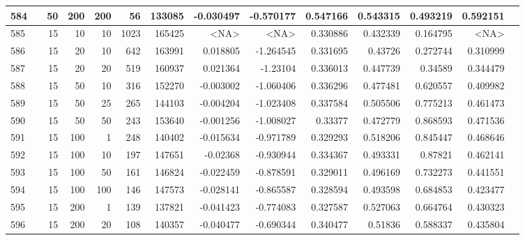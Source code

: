 \begin{longtable}{llrrrrrrrrrrrr}
		584 & &           50 &               200 &          200 &          56 &     133085 & -0.030497 & -0.570177 &  0.547166 &    0.543315 &       0.493219 &  0.592151 \\\midrule
		585 & \multirow[t]{46}{*}{\rotatebox[origin=r]{90}{use-lexrank-weighted}} &           15 &                10 &           10 &        1023 &     165425 &      <NA> &      <NA> &  0.330886 &    0.432339 &       0.164795 &  <NA> \\
		586 & &           15 &                20 &           10 &         642 &     163991 &  0.018805 & -1.264545 &  0.331695 &     0.43726 &       0.272744 &  0.310999 \\
		587 & &           15 &                20 &           20 &         519 &     160937 &  0.021364 &  -1.23104 &  0.336013 &    0.447739 &        0.34589 &  0.344479 \\
		588 & &           15 &                50 &           10 &         316 &     152270 & -0.003002 & -1.060406 &  0.336296 &    0.477481 &       0.620557 &  0.409982 \\
		589 & &           15 &                50 &           25 &         265 &     144103 & -0.004204 & -1.023408 &  0.337584 &    0.505506 &       0.775213 &  0.461473 \\
		590 & &           15 &                50 &           50 &         243 &     153640 & -0.001256 & -1.008027 &   0.33377 &    0.472779 &       0.868593 &  0.471536 \\
		591 & &           15 &               100 &            1 &         248 &     140402 & -0.015634 & -0.971789 &  0.329293 &    0.518206 &       0.845447 &  0.468646 \\
		592 & &           15 &               100 &           10 &         197 &     147651 &  -0.02368 & -0.930944 &  0.334367 &    0.493331 &        0.87821 &  0.462141 \\
		593 & &           15 &               100 &           50 &         161 &     146824 & -0.022459 & -0.878591 &  0.329011 &    0.496169 &       0.732273 &  0.441551 \\
		594 & &           15 &               100 &          100 &         146 &     147573 & -0.028141 & -0.865587 &  0.328594 &    0.493598 &       0.684853 &  0.423477 \\
		595 & &           15 &               200 &            1 &         139 &     137821 & -0.041423 & -0.774083 &  0.327587 &    0.527063 &       0.664764 &  0.430323 \\
		596 & &           15 &               200 &           20 &         108 &     140357 & -0.040477 & -0.690344 &  0.340477 &     0.51836 &       0.588337 &  0.435804 \\

\end{longtable}
